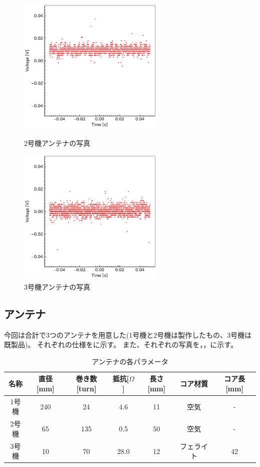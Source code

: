 \documentclass[report.tex]{subfiles}
\begin{document}
\begin{figure}[H]
	\begin{minipage}[b]{0.5\linewidth}
		\centering
		\includegraphics[width=7cm]{fig/koil_diode.pdf}
		\caption{2号機アンテナの写真}
		\label{fig:koil_diode}
	\end{minipage}
	\begin{minipage}[b]{0.5\linewidth}
		\centering
		\includegraphics[width=7cm]{fig/koil_diode_bi.pdf}
		\caption{3号機アンテナの写真}
		\label{fig:koil_diode_bi}
	\end{minipage}
\end{figure}

\subsection{アンテナ}

今回は合計で3つのアンテナを用意した(1号機と2号機は製作したもの、3号機は既製品)。
それぞれの仕様をに示す。
また、それぞれの写真を，，に示す。

\begin{table}[h]
	\centering
	\caption{アンテナの各パラメータ}
	\label{tab:ant}
	\begin{tabular}{ccccccc} \hline
		名称  & 直径[mm] & 巻き数[turn] & 抵抗[\(\Omega\)] & 長さ[mm] & コア材質  & コア長[mm] \\ \hline
		1号機 & 240    & 24        & 4.6            & 11     & 空気    & -       \\
		2号機 & 65     & 135       & 0.5            & 50     & 空気    & -       \\
		3号機 & 10     & 70        & 28.0           & 12     & フェライト & 42      \\ \hline
	\end{tabular}
\end{table}
\end{document}

